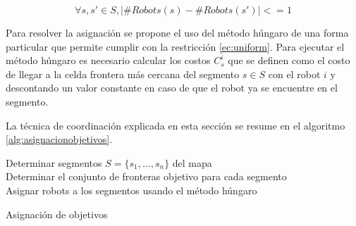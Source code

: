 \begin{equation}\label{ec:uniform}
  \forall s,s' \in S, |\#Robots(s) - \#Robots(s')| <= 1
\end{equation}

Para resolver la asignación se propone el uso del método húngaro \cite{kuhn1955hungarian} de una forma particular que permite cumplir con la restricción \eqref{ec:uniform}. Para ejecutar el método húngaro es necesario calcular los costos $C_{s}^{i}$ que se definen como el costo de llegar a la celda frontera más cercana del segmento $s \in S$ con el robot $i$ y descontando un valor constante en caso de que el robot ya se encuentre en el segmento. 

La técnica de coordinación explicada en esta sección se resume en el algoritmo \ref{alg:asignacionobjetivos}.

\begin{algorithm}[H]
\SetAlgoLined
    Determinar segmentos $S = \{s_{1} , ..., s_{n} \}$ del mapa\\
    Determinar el conjunto de fronteras objetivo para cada segmento\\
    Asignar robots a los segmentos usando el método húngaro\\
    \caption{Asignación de objetivos}
    \label{alg:asignacionobjetivos}
\end{algorithm}


